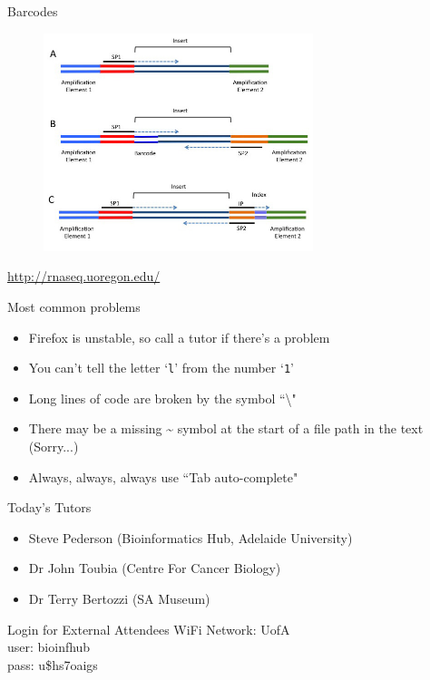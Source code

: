 \documentclass[11pt]{beamer}
\begin{document}
\begin{frame}{Barcodes}
\begin{figure}[h!]
  \centering
    \includegraphics[width=0.7\textwidth]{images/elements.jpg}
\end{figure}
\url{http://rnaseq.uoregon.edu/}
\end{frame}


\begin{frame}{Most common problems}
\begin{itemize}
\item Firefox is unstable, so call a tutor if there's a problem
\item You can't tell the letter `\texttt{l}' from the number `\texttt{1}'
\item Long lines of code are broken by the symbol ``\textbackslash"
\item There may be a missing \~{} symbol at the start of a file path in the text  (Sorry...)
\item Always, always, always use ``Tab auto-complete"
\end{itemize}
\end{frame}

\begin{frame}{Today's Tutors}
\begin{itemize}
	\item Steve Pederson (Bioinformatics Hub, Adelaide University)
	\item Dr John Toubia (Centre For Cancer Biology)
	\item Dr Terry Bertozzi (SA Museum)
\end{itemize}
\end{frame}


\begin{frame}{Login for External Attendees}
WiFi Network: UofA \\
user: bioinfhub \\
pass: u\$hs7oaigs

\end{frame}
\end{document}
